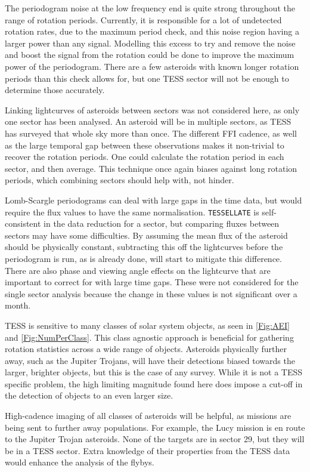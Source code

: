 \documentclass{UCreport}
\begin{document}
The periodogram noise at the low frequency end is quite strong throughout the range of rotation periods.
Currently, it is responsible for a lot of undetected rotation rates, due to the maximum period check, and this noise region having a larger power than any signal.
Modelling this excess to try and remove the noise and boost the signal from the rotation could be done to improve the maximum power of the periodogram.
There are a few asteroids with known longer rotation periods than this check allows for, but one TESS sector will not be enough to determine those accurately.

Linking lightcurves of asteroids between sectors was not considered here, as only one sector has been analysed.
An asteroid will be in multiple sectors, as TESS has surveyed that whole sky more than once.
The different FFI cadence, as well as the large temporal gap between these observations makes it non-trivial to recover the rotation periods.
One could calculate the rotation period in each sector, and then average.
This technique once again biases against long rotation periods, which combining sectors should help with, not hinder.

Lomb-Scargle periodograms can deal with large gaps in the time data, but would require the flux values to have the same normalisation.
\texttt{TESSELLATE} is self-consistent in the data reduction for a sector, but comparing fluxes between sectors may have some difficulties.
By assuming the mean flux of the asteroid should be physically constant, subtracting this off the lightcurves before the periodogram is run, as is already done, will start to mitigate this difference. 
There are also phase and viewing angle effects on the lightcurve that are important to correct for with large time gaps. %
These were not considered for the single sector analysis because the change in these values is not significant over a month.

TESS is sensitive to many classes of solar system objects, as seen in \autoref{Fig:AEI} and \autoref{Fig:NumPerClass}. 
This class agnostic approach is beneficial for gathering rotation statistics across a wide range of objects. 
Asteroids physically further away, such as the Jupiter Trojans, will have their detections biased towards the larger, brighter objects, but this is the case of any survey.
While it is not a TESS specific problem, the high limiting magnitude found here does impose a cut-off in the detection of objects to an even larger size. 

High-cadence imaging of all classes of asteroids will be helpful, as missions are being sent to further away populations.
For example, the Lucy mission \citep{Olkin2021} is en route to the Jupiter Trojan asteroids.
None of the targets are in sector 29, but they will be in a TESS sector. 
Extra knowledge of their properties from the TESS data would enhance the analysis of the flybys.
\end{document}
